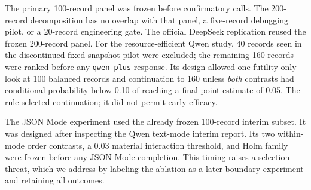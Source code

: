 \documentclass[11pt,a4paper]{article}
\begin{document}
\begin{table}[t]
\caption{Study stages, record panels, interfaces, and formal status.}
\label{tab:markdown-1}
\centering
{}
\end{table}
The primary 100-record panel was frozen before confirmatory calls. The 200-record decomposition has no overlap with that panel, a five-record debugging pilot, or a 20-record engineering gate. The official DeepSeek replication reused the frozen 200-record panel. For the resource-efficient Qwen study, 40 records seen in the discontinued fixed-snapshot pilot were excluded; the remaining 160 records were ranked before any \texttt{qwen-plus} response. Its design allowed one futility-only look at 100 balanced records and continuation to 160 unless \emph{both} contrasts had conditional probability below 0.10 of reaching a final point estimate of 0.05. The rule selected continuation; it did not permit early efficacy.

The JSON Mode experiment used the already frozen 100-record interim subset. It was designed after inspecting the Qwen text-mode interim report. Its two within-mode order contrasts, a 0.03 material interaction threshold, and Holm family were frozen before any JSON-Mode completion. This timing raises a selection threat, which we address by labeling the ablation as a later boundary experiment and retaining all outcomes.
\end{document}
